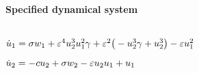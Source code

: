 \(\)
\paragraph{Specified dynamical system}
\(
\)\par
\(\dot u_{1}=\sigma  w_{1}+\varepsilon^{4} u_{2}^{3} u_{1}^{2} \gamma +\varepsilon^{2} 
\big(-u_{2}^{3} \gamma +u_{2}^{3}\big)-\varepsilon u_{1}^{2}
\)\par
\(\dot u_{2}=-c u_{2}+\sigma  w_{2}-\varepsilon u_{2} u_{1}+u_{1}
\)\par
